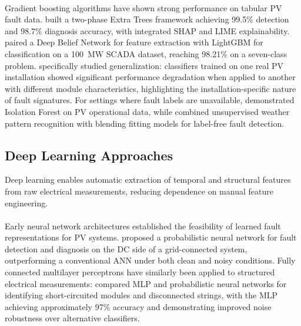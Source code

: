 \paragraph{}
Gradient boosting algorithms have shown strong performance on tabular PV fault data. \citet{noura_explainable_2025} built a two-phase Extra Trees framework achieving 99.5\% detection and 98.7\% diagnosis accuracy, with integrated SHAP and LIME explainability. \citet{kull_adaptive_2025} paired a Deep Belief Network for feature extraction with LightGBM for classification on a 100~MW SCADA dataset, reaching 98.21\% on a seven-class problem. \citet{zwirtes_fault_2025} specifically studied generalization: classifiers trained on one real PV installation showed significant performance degradation when applied to another with different module characteristics, highlighting the installation-specific nature of fault signatures. For settings where fault labels are unavailable, \citet{kabir_isolation_2023} demonstrated Isolation Forest on PV operational data, while \citet{qu2022unsupervised} combined unsupervised weather pattern recognition with blending fitting models for label-free fault detection.

\subsection{Deep Learning Approaches}

Deep learning enables automatic extraction of temporal and structural features from raw electrical measurements, reducing dependence on manual feature engineering.

\paragraph{}
Early neural network architectures established the feasibility of learned fault representations for PV systems. \citet{garoudja2017ml} proposed a probabilistic neural network for fault detection and diagnosis on the DC side of a grid-connected system, outperforming a conventional ANN under both clean and noisy conditions. Fully connected multilayer perceptrons have similarly been applied to structured electrical measurements: \citet{vieira2022mlp} compared MLP and probabilistic neural networks for identifying short-circuited modules and disconnected strings, with the MLP achieving approximately 97\% accuracy and demonstrating improved noise robustness over alternative classifiers.

